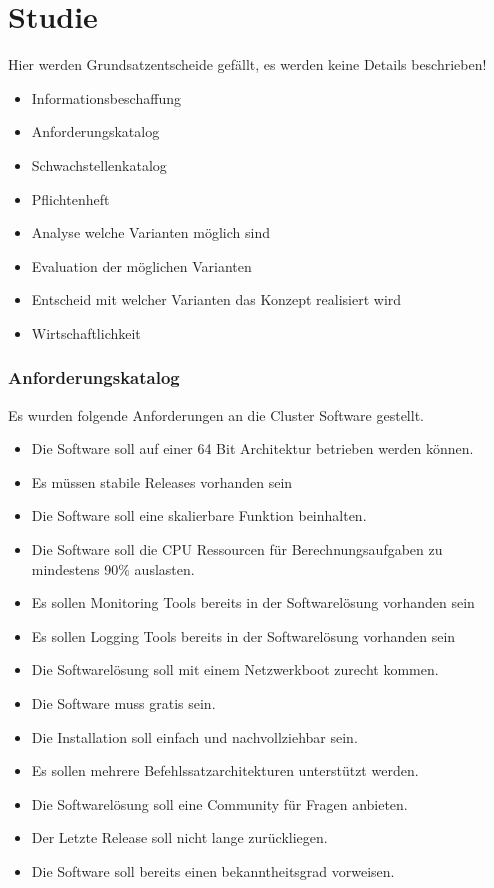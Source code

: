 \section{Studie} 
\label{sec:Studie}
Hier werden Grundsatzentscheide gefällt, es werden keine Details beschrieben!
\begin{itemize}
	\item Informationsbeschaffung
	\item Anforderungskatalog
	\item Schwachstellenkatalog
	\item Pflichtenheft
	\item Analyse welche Varianten möglich sind
	\item Evaluation der möglichen Varianten
	\item Entscheid mit welcher Varianten das Konzept realisiert wird
	\item Wirtschaftlichkeit
\end{itemize}


\subsubsection{Anforderungskatalog}
Es wurden folgende Anforderungen an die Cluster Software gestellt.

\begin{itemize}
\item Die Software soll auf einer 64 Bit Architektur betrieben werden können.
\item Es müssen stabile Releases vorhanden sein
\item Die Software soll eine skalierbare Funktion beinhalten.
\item Die Software soll die CPU Ressourcen für Berechnungsaufgaben zu mindestens 90\% auslasten.
\item Es sollen Monitoring Tools bereits in der Softwarelösung vorhanden sein
\item Es sollen Logging Tools bereits in der Softwarelösung vorhanden sein
\item Die Softwarelösung soll mit einem Netzwerkboot zurecht kommen.
\item Die Software muss gratis sein.
\item Die Installation soll einfach und nachvollziehbar sein.
\item Es sollen mehrere Befehlssatzarchitekturen unterstützt werden.
\item Die Softwarelösung soll eine Community für Fragen anbieten.
\item Der Letzte Release soll nicht lange zurückliegen.
\item Die Software soll bereits einen bekanntheitsgrad vorweisen.
\end{itemize}



